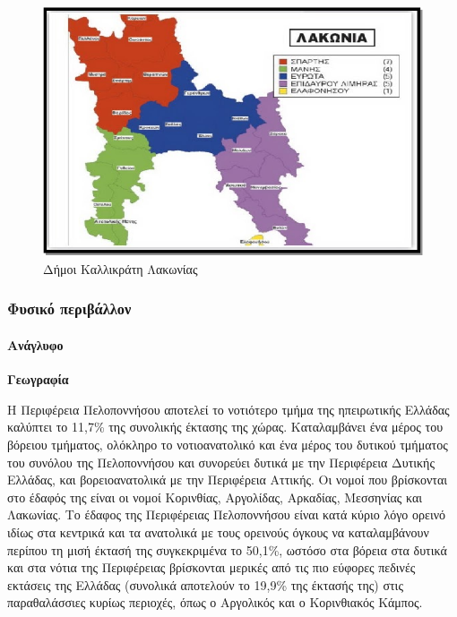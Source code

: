 \documentclass[12pt]{article}
\begin{document}
	\begin{figure} [H]
		\begin{center}
			\includegraphics [scale = 0.60] {lakonia.png}
			\caption{Δήμοι Καλλικράτη Λακωνίας}
		\end{center}
	\end{figure}
	
	\subsubsection{Φυσικό περιβάλλον}
	
	\paragraph{Ανάγλυφο}
	
	\textbf{Γεωγραφία} 
	
	Η Περιφέρεια Πελοποννήσου αποτελεί το νοτιότερο τμήμα της ηπειρωτικής Ελλάδας καλύπτει το 11,7\% της συνολικής έκτασης της χώρας. Καταλαμβάνει ένα μέρος του βόρειου τμήματος, ολόκληρο το νοτιοανατολικό και ένα μέρος του δυτικού τμήματος του συνόλου της Πελοποννήσου και συνορεύει δυτικά με την Περιφέρεια Δυτικής Ελλάδας, και βορειοανατολικά με την Περιφέρεια Αττικής. Οι νομοί που βρίσκονται στο έδαφός της είναι οι νομοί Κορινθίας, Αργολίδας, Αρκαδίας, Μεσσηνίας και Λακωνίας. Το έδαφος της Περιφέρειας Πελοποννήσου είναι κατά κύριο λόγο ορεινό ιδίως στα κεντρικά  και τα ανατολικά με τους ορεινούς όγκους να καταλαμβάνουν περίπου τη μισή έκτασή της συγκεκριμένα το 50,1\%, ωστόσο στα βόρεια στα δυτικά και στα νότια της Περιφέρειας βρίσκονται μερικές από τις πιο εύφορες πεδινές εκτάσεις της Ελλάδας (συνολικά αποτελούν το 19,9\% της έκτασής της) στις παραθαλάσσιες κυρίως περιοχές, όπως ο Αργολικός και ο Κορινθιακός Κάμπος.
	
\end{document}
